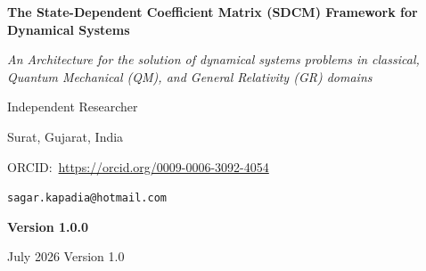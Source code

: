 
\begin{titlepage}
	\centering
	
	\vspace*{2cm}
	
	{\Huge\bfseries The State-Dependent Coefficient Matrix (SDCM) Framework for Dynamical Systems \\ \par}
	
	\vspace{0.8cm}
	
	{\LARGE\itshape An Architecture for the solution of dynamical systems problems in  classical, Quantum Mechanical (QM), and General Relativity (GR) domains\par}
	
	\vspace{2cm}
	
	\author{
		\textbf{Kapadia, Sagar}\\
		\small Independent Researcher, Surat, Gujarat, India\\
		\small ORCID: \href{https://orcid.org/0009-0006-3092-4054}{0009-0006-3092-4054} | \href{mailto:sagar.kapadia@hotmail.com}{sagar.kapadia@hotmail.com}
	}
	
	
	
	\vspace{0.4cm}
	
	{\large Independent Researcher\par}
	
	\vspace{0.3cm}
	
	{\large Surat, Gujarat, India\par}
	
	\vspace{0.6cm}
	
	{\small
		ORCID:\ \url{https://orcid.org/0009-0006-3092-4054}\par}
	
	\vspace{0.25cm}
	
	{\small
		\texttt{sagar.kapadia@hotmail.com}\par}
	
	\vfill
	
	{\large\bfseries Version 1.0.0\par}
	
	\vspace{0.6cm}
	
	{\Large July 2026 Version 1.0 \par}
	
	\vspace{0.75cm}
	
\end{titlepage}